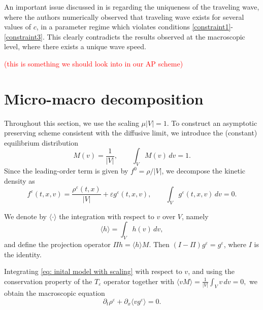 \documentclass[11pt,twoside]{article}
\numberwithin{equation}{section}
\theoremstyle{plain}
\theoremstyle{nonumberplain}
\begin{document}
\noindent An important issue discussed in \cite{calvez2018well} is regarding the uniqueness of the traveling wave, where the authors numerically observed that traveling wave exists for several values of $c$, in a parameter regime which violates conditions \eqref{constraint1}-\eqref{constraint3}. This clearly contradicts the results observed at the macroscopic level, where there exists a unique wave speed.  

\textcolor{red}{(this is something we should look into in our AP scheme)}
\fi

{
\section{Micro-macro decomposition}
\label{sec: micro macro decomp}

Throughout this section, we use the scaling $\mu |V|=1$. 
To construct an asymptotic preserving scheme consistent with the diffusive limit, we introduce the (constant) equilibrium distribution 
\[
M(v)=\frac1{|V|},
\qquad \int_V M(v)\,dv=1.
\]
Since the leading-order term is given by \(f^0=\rho/|V|\), we decompose the kinetic density as
\begin{equation}\label{f_expansion}
f^\varepsilon(t,x,v)=\frac{\rho^\varepsilon(t,x)}{|V|}+\varepsilon g^\varepsilon(t,x,v),
\qquad
\int_V g^\varepsilon(t,x,v)\,dv=0.
\end{equation}


We denote by \(\langle \cdot \rangle\) the integration with respect to \(v\) over \(V\), namely
\[
\langle h\rangle = \int_V h(v)\,dv,
\]
and define the projection operator
$
\Pi h = \langle h\rangle M.
$ Then \((I-\Pi)g^\varepsilon=g^\varepsilon\), where $I$ is the identity.

Integrating \eqref{eq: inital model with scaling} with respect to \(v\), and using the conservation property of the $T_\varepsilon$ operator together with
$
\langle vM\rangle = \frac1{|V|}\int_V v\,dv = 0,
$
we obtain the macroscopic equation
\[
\partial_t \rho^\varepsilon + \partial_x \langle v g^\varepsilon\rangle = 0.
\]


}
\end{document}

